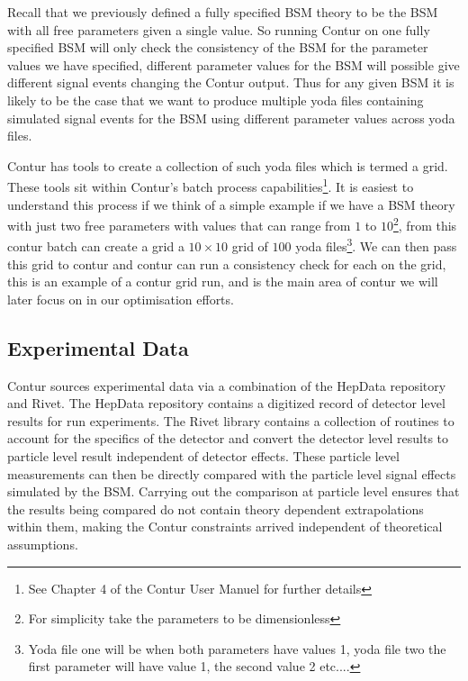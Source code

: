 Recall that we previously defined a fully specified BSM theory to be the BSM with all free parameters given a single value. So running Contur on one fully specified BSM will only check the consistency of the BSM for the parameter values we have specified, different parameter values for the BSM will possible give different signal events changing the Contur output. Thus for any given BSM it is likely to be the case that we want to produce multiple yoda files containing simulated signal events for the BSM using different parameter values across yoda files. 

Contur has tools to create a collection of such yoda files which is termed a grid. These tools sit within Contur's batch process capabilities\footnote{See Chapter 4 of the Contur User Manuel\cite{contur_manuel} for further details}. It is easiest to understand this process if we think of a simple example if we have a BSM theory with just two free parameters with values that can range from $1$ to $10$\footnote{For simplicity take the parameters to be dimensionless}, from this contur batch can create a grid a $10\times 10$ grid of $100$ yoda files\footnote{Yoda file one will be when both parameters have values 1, yoda file two the first parameter will have value 1, the second value 2 etc....}. We can then pass this grid to contur and contur can run a consistency check for each on the grid, this is an example of a contur grid run, and is the main area of contur we will later focus on in our optimisation efforts.

\subsection{Experimental Data}

Contur sources experimental data via a combination of the HepData\cite{HEPData} repository and Rivet\cite{Rivet}. The HepData repository contains a digitized record of detector level results for run experiments. The Rivet library contains a collection of routines to account for the specifics of the detector and convert the detector level results to particle level result independent of detector effects. These particle level measurements can then be directly compared with the particle level signal effects simulated by the BSM. Carrying out the comparison at particle level ensures that the results being compared do not contain theory dependent extrapolations within them, making the Contur constraints arrived independent of theoretical assumptions. 


